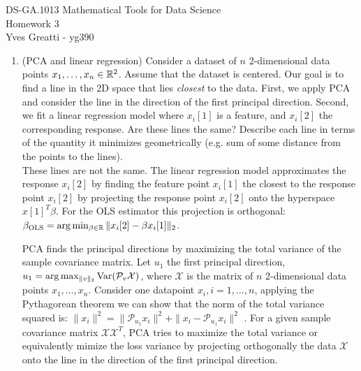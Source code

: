 \documentclass[12pt,twoside]{article}
\begin{document}
\noindent DS-GA.1013 Mathematical Tools for Data Science \\
Homework 3 \\
Yves Greatti - yg390\\

\begin{enumerate}
\item (PCA and linear regression) Consider a dataset of $n$ 2-dimensional data points $x_1,\ldots,x_n \in \mathbb{R}^2$. Assume that the dataset is centered. Our goal is to find a line in the 2D space that lies \emph{closest} to the data. First, we apply PCA and consider the line in the direction of the first principal direction. Second, we fit a linear regression model where $x_i[1]$ is a feature, and $x_i[2]$ the corresponding response. Are these lines the same? Describe each line in terms of the quantity it minimizes geometrically (e.g. sum of some distance from the points to the lines).\\

	These lines are not the same. The linear regression model approximates the response $x_i[2]$ by  finding the feature point  $x_i[1]$  the closest to the response point $x_i[2]$ by projecting the response point $x_i[2]$
	onto the hyperspace $x[1]^T \beta $. For the OLS estimator this projection is orthogonal: $\beta_{\text{OLS}} =  \arg \min_{\beta \in \mathbb{R}} \| x_i[2] - \beta x_i[1] \|_2$.
	
	PCA finds the principal directions by maximizing the total variance of the sample covariance matrix.
	Let $u_1$ the first principal direction, $u_1 = \arg \max_{\|v\|_2} \var(\mathcal{P}_v \mathcal{X})$, where $ \mathcal{X}$ is the matrix of $n$ 2-dimensional data points $x_1,\ldots,x_n$. 
	Consider one datapoint $x_i, i=1, \ldots,n$, applying the Pythagorean theorem we can show that the norm of the total variance squared is: 
	$\|x_i\|^2 = \| \mathcal{P}_{u_1} x_i\|^2 + \| x_i - \mathcal{P}_{u_1} x_i \|^2$ .
	For a given sample covariance  matrix $\mathcal{X} \mathcal{X}^T$, PCA tries to maximize the total variance or equivalently mimize the loss variance by projecting orthogonally the data  $\mathcal{X}$ onto the  line  in the direction of the first principal direction.
	


\end{enumerate}
\end{document}
